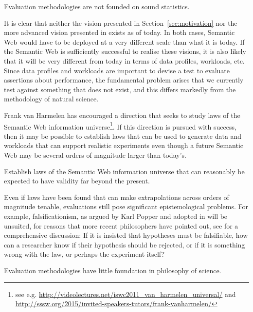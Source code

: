 \begin{problem}\label{prob:badstats}
Evaluation methodologies are not founded on sound statistics.
\end{problem}

It is clear that neither the vision presented in
Section~\ref{sec:motivation} nor the more advanced vision presented in
\cite{berners2001semantic} exists as of today. In both cases, Semantic
Web would have to be deployed at a very different scale than what it
is today. If the Semantic Web is sufficiently successful to realise
these visions, it is also likely that it will be very different from
today in terms of data profiles, workloads, etc. Since data profiles
and workloads are important to devise a test to evaluate assertions
about performance, the fundamental problem arises that we currently
test against something that does not exist, and this differs markedly
from the methodology of natural science.

Frank van Harmelen has encouraged a direction that seeks to study laws
of the Semantic Web information universe\footnote{see
  e.g. \url{http://videolectures.net/iswc2011_van_harmelen_universal/}
  and
  \url{http://sssw.org/2015/invited-speakers-tutors/frank-vanharmelen/}}.
If this direction is pursued with success, then it may be possible to
establish laws that can be used to generate data and workloads that
can support realistic experiments even though a future Semantic Web
may be several orders of magnitude larger than today's.


\begin{problem}\label{prob:lawsfuture}
Establish laws of the Semantic Web information universe that can reasonably be
expected to have validity far beyond the present.
\end{problem}

Even if laws have been found that can make extrapolations across
orders of magnitude tenable, evaluations still pose significant
epistemological problems. For example, falsificationism, as argued by
Karl Popper and adopted in \cite{avinatguide} will be unsuited, for
reasons that more recent philosophers have pointed out, see
\cite{chalmers1999whatis} for a comprehensive discussion: If it is
insisted that hypotheses must be falsifiable, how can a researcher
know if their hypothesis should be rejected, or if it is something
wrong with the law, or perhaps the experiment itself?


\begin{problem}\label{prob:badphil}
Evaluation methodologies have little foundation in philosophy of science.
\end{problem}


